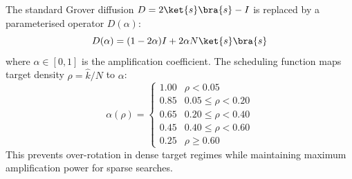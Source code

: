 The standard Grover diffusion $D = 2\ket{s}\bra{s} - I$ is replaced by a
parameterised operator $D(\alpha)$:
\begin{equation}
  D(\alpha) = (1 - 2\alpha)I + 2\alpha N \ket{s}\bra{s}
\end{equation}
where $\alpha \in [0,1]$ is the amplification coefficient. The scheduling
function maps target density $\rho = \hat{k}/N$ to $\alpha$:
\begin{equation}
  \alpha(\rho) = \begin{cases}
    1.00 & \rho < 0.05 \\
    0.85 & 0.05 \leq \rho < 0.20 \\
    0.65 & 0.20 \leq \rho < 0.40 \\
    0.45 & 0.40 \leq \rho < 0.60 \\
    0.25 & \rho \geq 0.60
  \end{cases}
\end{equation}
This prevents over-rotation in dense target regimes while maintaining
maximum amplification power for sparse searches.

